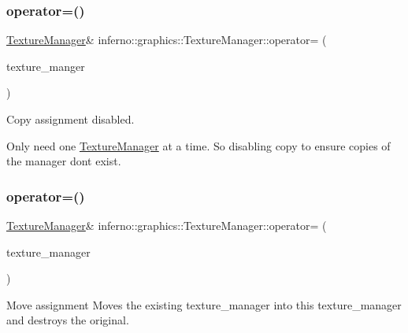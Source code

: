 \subsubsection{\texorpdfstring{operator=()}{operator=()}\hspace{0.1cm}{\footnotesize\ttfamily [1/2]}}
{\footnotesize\ttfamily \mbox{\hyperlink{classinferno_1_1graphics_1_1_texture_manager}{Texture\+Manager}}\& inferno\+::graphics\+::\+Texture\+Manager\+::operator= (\begin{DoxyParamCaption}\item[{const \mbox{\hyperlink{classinferno_1_1graphics_1_1_texture_manager}{Texture\+Manager}} \&}]{texture\+\_\+manger }\end{DoxyParamCaption})\hspace{0.3cm}{\ttfamily [delete]}}



Copy assignment disabled. 

Only need one \mbox{\hyperlink{classinferno_1_1graphics_1_1_texture_manager}{Texture\+Manager}} at a time. So disabling copy to ensure copies of the manager don\textquotesingle{}t exist. \mbox{\label{classinferno_1_1graphics_1_1_texture_manager_ac413011a070590a960995b21eb4e3fdb}} 
\subsubsection{\texorpdfstring{operator=()}{operator=()}\hspace{0.1cm}{\footnotesize\ttfamily [2/2]}}
{\footnotesize\ttfamily \mbox{\hyperlink{classinferno_1_1graphics_1_1_texture_manager}{Texture\+Manager}}\& inferno\+::graphics\+::\+Texture\+Manager\+::operator= (\begin{DoxyParamCaption}\item[{\mbox{\hyperlink{classinferno_1_1graphics_1_1_texture_manager}{Texture\+Manager}} \&\&}]{texture\+\_\+manager }\end{DoxyParamCaption})\hspace{0.3cm}{\ttfamily [inline]}}



Move assignment Moves the existing texture\+\_\+manager into this texture\+\_\+manager and destroys the original. 


